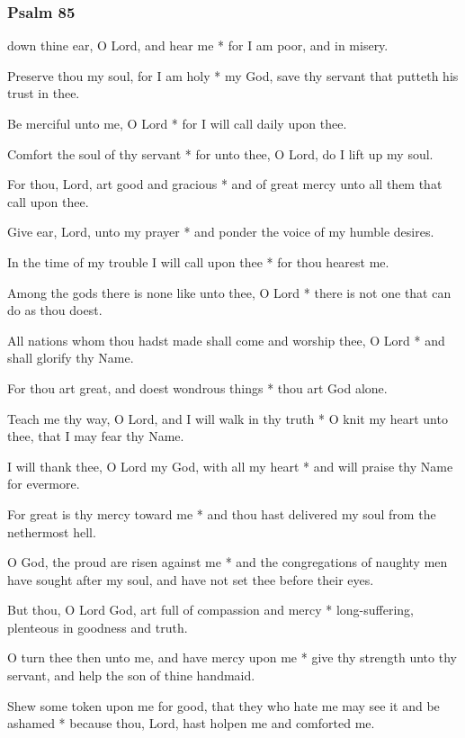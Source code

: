 \subsubsection{Psalm 85}


 down thine ear, O Lord, and hear me * for I am poor, and in misery.

Preserve thou my soul, for I am holy * my God, save thy servant that putteth his trust in thee.

Be merciful unto me, O Lord * for I will call daily upon thee.

Comfort the soul of thy servant * for unto thee, O Lord, do I lift up my soul.

For thou, Lord, art good and gracious * and of great mercy unto all them that call upon thee.

Give ear, Lord, unto my prayer * and ponder the voice of my humble desires.

In the time of my trouble I will call upon thee * for thou hearest me.

Among the gods there is none like unto thee, O Lord * there is not one that can do as thou doest.

All nations whom thou hadst made shall come and worship thee, O Lord * and shall glorify thy Name.

For thou art great, and doest wondrous things * thou art God alone.

Teach me thy way, O Lord, and I will walk in thy truth * O knit my heart unto thee, that I may fear thy Name.

I will thank thee, O Lord my God, with all my heart * and will praise thy Name for evermore.

For great is thy mercy toward me * and thou hast delivered my soul from the nethermost hell.

O God, the proud are risen against me * and the congregations of naughty men have sought after my soul, and have not set thee before their eyes.

But thou, O Lord God, art full of compassion and mercy * long-suffering, plenteous in goodness and truth.

O turn thee then unto me, and have mercy upon me * give thy strength unto thy servant, and help the son of thine handmaid.

Shew some token upon me for good, that they who hate me may see it and be ashamed * because thou, Lord, hast holpen me and comforted me.

